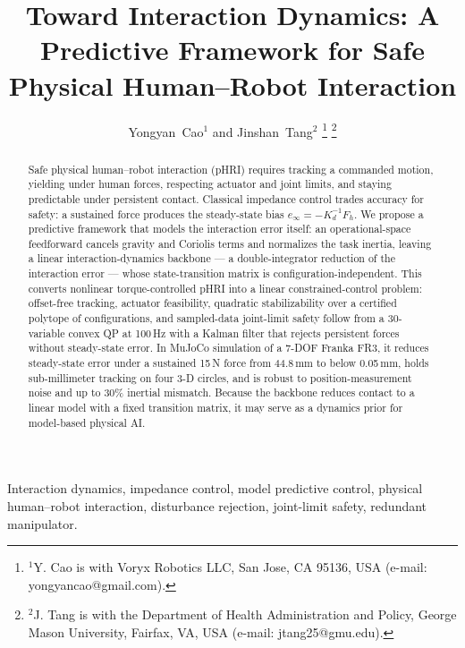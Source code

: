 \documentclass[journal]{IEEEtran}
\begin{document}
\title{Toward Interaction Dynamics: A Predictive Framework for Safe Physical Human–Robot Interaction}

\author{Yongyan~Cao$^{1}$ and Jinshan~Tang$^{2}$%
\thanks{$^{1}$Y. Cao is with Voryx Robotics LLC, San Jose, CA 95136, USA
(e-mail: yongyancao@gmail.com).}%
\thanks{$^{2}$J. Tang is with the Department of Health Administration and
Policy, George Mason University, Fairfax, VA, USA
(e-mail: jtang25@gmu.edu).}}

\maketitle

\begin{abstract}
Safe physical human--robot interaction (pHRI) requires tracking a
commanded motion, yielding under human forces, respecting actuator and
joint limits, and staying predictable under persistent contact.
Classical impedance control trades accuracy for safety: a sustained
force produces the steady-state bias $e_\infty=-K_d^{-1}F_h$.
We propose a predictive framework that models the interaction error
itself: an operational-space feedforward cancels gravity and Coriolis
terms and normalizes the task inertia, leaving a linear
interaction-dynamics backbone --- a double-integrator reduction of the
interaction error --- whose state-transition matrix is
configuration-independent.
This converts nonlinear torque-controlled pHRI into a linear
constrained-control problem: offset-free tracking, actuator feasibility,
quadratic stabilizability over a certified polytope of configurations,
and sampled-data joint-limit safety follow from a 30-variable convex QP
at 100\,Hz with a Kalman filter that rejects persistent forces without
steady-state error.
In MuJoCo simulation of a 7-DOF Franka FR3, it reduces steady-state
error under a sustained 15\,N force from 44.8\,mm to below 0.05\,mm,
holds sub-millimeter tracking on four 3-D circles, and is robust to
position-measurement noise and up to 30\% inertial mismatch.
Because the backbone reduces contact to a linear model with a fixed
transition matrix, it may serve as a dynamics prior for model-based
physical AI.
\end{abstract}

\begin{IEEEkeywords}
Interaction dynamics, impedance control, model predictive control,
physical human--robot interaction, disturbance rejection, joint-limit
safety, redundant manipulator.
\end{IEEEkeywords}
\end{document}
